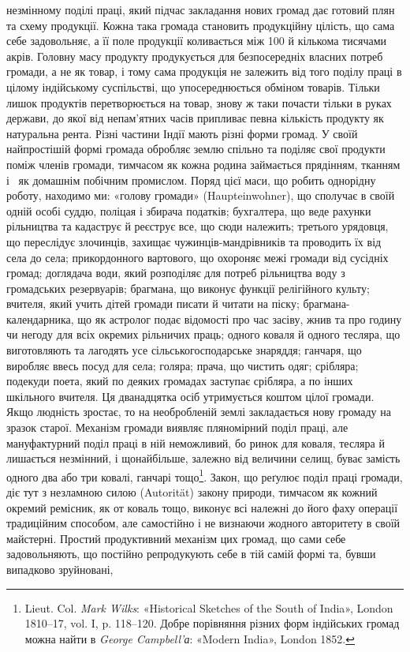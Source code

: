\parcont{}  %
незмінному поділі праці, який підчас закладання нових громад
дає готовий плян та схему продукції. Кожна така громада становить
продукційну цілість, що сама себе задовольняє, а її поле
продукції коливається між 100 й кількома тисячами акрів. Головну
масу продукту продукується для безпосередніх власних
потреб громади, а не як товар, і тому сама продукція не залежить
від того поділу праці в цілому індійському суспільстві, що упосереднюється
обміном товарів. Тільки лишок продуктів перетворюється
на товар, знову ж таки почасти тільки в руках держави,
до якої від непам’ятних часів припливає певна кількість продукту
як натуральна рента. Різні частини Індії мають різні
форми громад. У своїй найпростішій формі громада обробляє
землю спільно та поділяє свої продукти поміж членів громади,
тимчасом як кожна родина займається прядінням, тканням і~
як домашнім побічним промислом. Поряд цієї маси, що робить
однорідну роботу, находимо ми: «голову громади» (Haupteinwohner),
що сполучає в своїй одній особі суддю, поліцая і збирача
податків; бухгалтера, що веде рахунки рільництва та кадаструє
й реєструє все, що сюди належить; третього урядовця, що переслідує
злочинців, захищає чужинців-мандрівників та проводить
їх від села до села; прикордонного вартового, що охороняє межі
громади від сусідніх громад; доглядача води, який розподіляє
для потреб рільництва воду з громадських резервуарів; брагмана,
що виконує функції релігійного культу; вчителя, який учить
дітей громади писати й читати на піску; брагмана-календарника,
що як астролог подає відомості про час засіву, жнив та про годину
чи негоду для всіх окремих рільничих праць; одного коваля й
одного тесляра, що виготовляють та лагодять усе сільськогосподарське
знаряддя; ганчаря, що виробляє ввесь посуд для
села; голяра; прача, що чистить одяг; срібляра; подекуди поета,
який по деяких громадах заступає срібляра, а по інших шкільного
вчителя. Ця дванадцятка осіб утримується коштом цілої
громади. Якщо людність зростає, то на необробленій землі закладається
нову громаду на зразок старої. Механізм громади виявляє
пляномірний поділ праці, але мануфактурний поділ праці в ній
неможливий, бо ринок для коваля, тесляра й~ лишається незмінний,
і щонайбільше, залежно від величини селищ, буває
замість одного два або три ковалі, ганчарі тощо\footnote{
Lieut. Col. \emph{Mark Wilks}: «Historical Sketches of the South
of India», London 1810--17, vol. I, p. 118--120. Добре порівняння
різних форм індійських громад можна найти в \emph{George Campbell’а}:
«Modern India», London 1852.
}. Закон, що
реґулює поділ праці громади, діє тут з незламною силою (Autorität)
закону природи, тимчасом як кожний окремий ремісник,
як от коваль тощо, виконує всі належні до його фаху операції
традиційним способом, але самостійно і не визнаючи жодного
авторитету в своїй майстерні. Простий продуктивний механізм
цих громад, що сами себе задовольняють, що постійно репродукують
себе в тій самій формі та, бувши випадково зруйновані,
\parbreak{}  %
